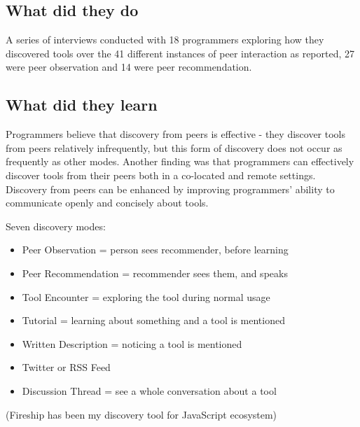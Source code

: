 \subsection{What did they do}

A series of interviews conducted with 18 programmers exploring how they discovered tools over the 41 different instances of peer interaction as reported, 27 were peer observation and 14 were peer recommendation.

\subsection{What did they learn}

Programmers believe that discovery from peers is effective - they discover tools from peers relatively infrequently, but this form of discovery does not occur as frequently as other modes. Another finding was that programmers can effectively discover tools from their peers both in a co-located and remote settings. Discovery from peers can be enhanced by improving programmers' ability to communicate openly and concisely about tools.

Seven discovery modes:

\begin{itemize}
    \item Peer Observation = person sees recommender, before learning
    \item Peer Recommendation = recommender sees them, and speaks
    \item Tool Encounter = exploring the tool during normal usage
    \item Tutorial = learning about something and a tool is mentioned
    \item Written Description = noticing a tool is mentioned
    \item Twitter or RSS Feed
    \item Discussion Thread = see a whole conversation about a tool
\end{itemize}

(Fireship has been my discovery tool for JavaScript ecosystem)

